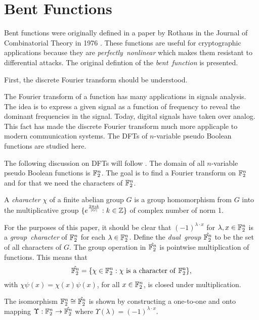 \section{Bent Functions}
\par Bent functions were originally defined in a paper by Rothaus in the Journal
of Combinatorial Theory in 1976 \cite{art:r76}. These functions are useful for
cryptographic applications because they are {\em perfectly\ nonlinear} which
makes them resistant to differential attacks. The original defintion of the
{\em bent\ function} is presented.

\par First, the discrete Fourier transform should be understood.

\par The Fourier transform of a function has many applications in signals analysis.
The idea is to express a given signal as a function of frequency to reveal the dominant
frequencies in the signal. Today, digital signals have taken over analog. This fact has
made the discrete Fourier transform much more applicaple to modern communication
systems. The DFTs of $n$-variable pseudo Boolean functions are studied here.

\par The following discussion on DFTs will follow \cite{bk:t99}. The domain of all
$n$-variable pseudo Boolean functions is $\mathbb{F}_2^n$. The goal is to find a Fourier transform
on $\mathbb{F}_2^n$ and for that we need the characters of $\mathbb{F}_2^n$.

\begin{definition}\cite{bk:t99}
	A {\em character} $\chi$ of a finite abelian group $G$ is a group homomorphism
	from $G$ into the multiplicative group $\{e^{\frac{2\pi\imath k}{\lvert G \rvert}}:k\in\mathbb{Z}\}$
	of complex number of norm 1.
\end{definition}

For the purposes of this paper, it should be clear that $(-1)^{\lambda\cdot x}$ for
$\lambda,x\in\mathbb{F}_2^n$ is a {\em group\ character} of $\mathbb{F}_2^n$ for each $\lambda\in\mathbb{F}_2^n$.
Define the {\em dual\ group} $\hat{\mathbb{F}_2^n}$ to be the set of all characters of $G$. The group
operation in $\hat{\mathbb{F}_2^n}$ is pointwise multiplication of functions. This means that
\[
\hat{\gftwo^n}=\{\chi\in\gftwo^n:\chi\ {\rm is\ a\ character\ of\ \gftwo^n}\},
\]
with $\chi\psi(x)=\chi(x)\psi(x)$, for all $x\in\mathbb{F}_2^n$, is closed under multiplication.

\par The isomorphism $\mathbb{F}_2^n\cong\hat{\mathbb{F}_2^n}$ is shown by constructing a one-to-one
and onto mapping $\Upsilon:\mathbb{F}_2^n\rightarrow\hat{\mathbb{F}_2^n}$ where
$\Upsilon(\lambda)=(-1)^{\lambda\cdot x}$.

